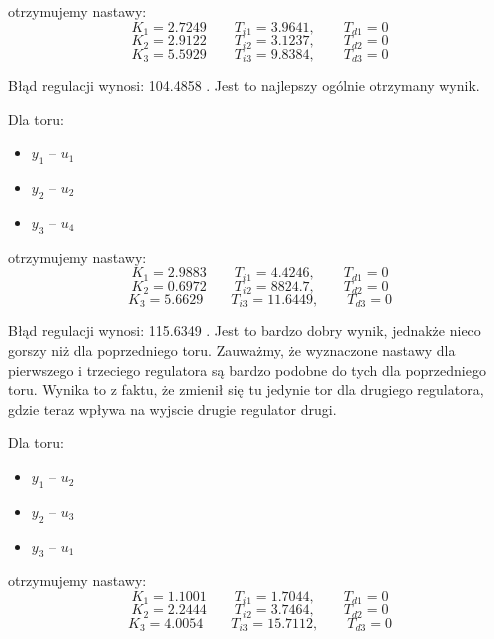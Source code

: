 otrzymujemy nastawy:
\begin{equation}
  K_1 = \num{2.7249} \qquad T_{i1} = \num{3.9641}, \qquad T_{d1} = 0 \nonumber
\end{equation}
\begin{equation}
  K_2 = \num{2.9122} \qquad T_{i2} = \num{3.1237}, \qquad T_{d2} = 0
\end{equation}
\begin{equation}
  K_3 = \num{5.5929} \qquad T_{i3} = \num{9.8384}, \qquad T_{d3} = 0 \nonumber
\end{equation}

Błąd regulacji wynosi: \num{104.4858} . Jest to najlepszy ogólnie otrzymany wynik.

Dla toru:
\begin{itemize}
  \item $y_1$ -- $u_1$
 \item $y_2$ -- $u_2$
 \item $y_3$ -- $u_4$
\end{itemize}

otrzymujemy nastawy:
\begin{equation}
  K_1 = \num{2.9883} \qquad T_{i1} = \num{4.4246}, \qquad T_{d1} = 0 \nonumber
\end{equation}
\begin{equation}
  K_2 = \num{0.6972} \qquad T_{i2} = \num{8824.7}, \qquad T_{d2} = 0
\end{equation}
\begin{equation}
  K_3 = \num{5.6629} \qquad T_{i3} = \num{11.6449}, \qquad T_{d3} = 0 \nonumber
\end{equation}

Błąd regulacji wynosi: \num{115.6349} .
Jest to bardzo dobry wynik, jednakże nieco gorszy niż dla poprzedniego toru.
Zauważmy, że wyznaczone nastawy dla pierwszego i trzeciego regulatora są bardzo podobne do tych dla poprzedniego toru.
Wynika to z faktu, że zmienił się tu jedynie tor dla drugiego regulatora, gdzie teraz wpływa na wyjscie drugie regulator drugi.

Dla toru:
\begin{itemize}
  \item $y_1$ -- $u_2$
 \item $y_2$ -- $u_3$
 \item $y_3$ -- $u_1$
\end{itemize}

otrzymujemy nastawy:
\begin{equation}
  K_1 = \num{1.1001} \qquad T_{i1} = \num{1.7044}, \qquad T_{d1} = 0 \nonumber
\end{equation}
\begin{equation}
  K_2 = \num{2.2444} \qquad T_{i2} = \num{3.7464}, \qquad T_{d2} = 0
\end{equation}
\begin{equation}
  K_3 = \num{4.0054} \qquad T_{i3} = \num{15.7112}, \qquad T_{d3} = 0 \nonumber
\end{equation}

